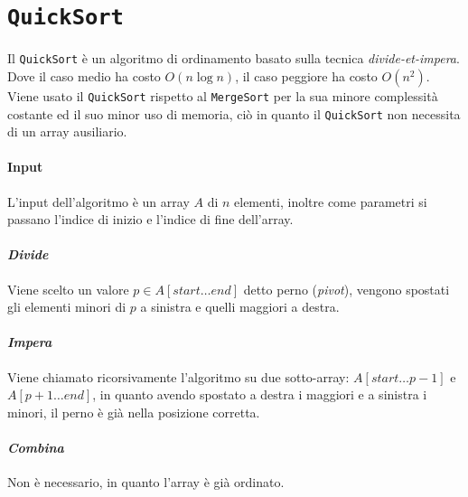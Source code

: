 \section{\texttt{QuickSort}}
    Il \texttt{QuickSort} è un algoritmo di ordinamento basato sulla tecnica \textit{divide-et-impera}. Dove il caso medio ha costo $O(n\log n)$, il caso peggiore ha costo $O(n^2)$. Viene usato il \texttt{QuickSort} rispetto al \texttt{MergeSort} per la sua minore complessità costante ed il suo minor uso di memoria, ciò in quanto il \texttt{QuickSort} non necessita di un array ausiliario.
    \paragraph{Input} L'input dell'algoritmo è un array $A$ di $n$ elementi, inoltre come parametri si passano l'indice di inizio e l'indice di fine dell'array.
    \paragraph{\textit{Divide}} Viene scelto un valore $p\in A[start\dots end]$ detto perno (\textit{pivot}), vengono spostati gli elementi minori di $p$ a sinistra e quelli maggiori a destra.
    \paragraph{\textit{Impera}} Viene chiamato ricorsivamente l'algoritmo su due sotto-array: $A[start\dots p-1]$ e $A[p+1\dots end]$, in quanto avendo spostato a destra i maggiori e a sinistra i minori, il perno è già nella posizione corretta.
    \paragraph{\textit{Combina}} Non è necessario, in quanto l'array è già ordinato.

